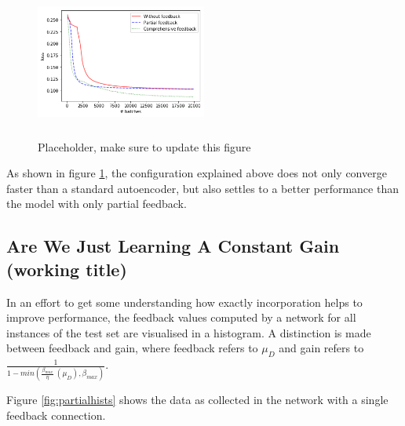 \documentclass{article}
\begin{document}
  \begin{figure}
      \centering
      \includegraphics[width=0.5\textwidth,height=5cm,keepaspectratio]{img/fullfb.png}
      \caption{Placeholder, make sure to update this figure}
      \label{fig:fullfeedback}
  \end{figure}
  
  As shown in figure \ref{fig:fullfeedback}, the configuration explained above does not only converge faster than a standard autoencoder, but also settles to a better performance than the model with only partial feedback. 
    
 \subsection{Are We Just Learning A Constant Gain (working title)} 
 In an effort to get some understanding how exactly incorporation helps to improve performance, the feedback values computed by a network for all instances of the test set are visualised in a histogram. A distinction is made between feedback and gain, where feedback refers to $\mu_D$ and gain refers to $\frac{1}{1 - min(\frac{\beta_{max}}{\eta} \ (\mu_D), \beta_{max})}$. 
 
 Figure \ref{fig:partialhists} shows the data as collected in the network with a single feedback connection. 
 
\end{document}
